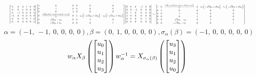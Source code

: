 \documentclass[11pt]{article}
\theoremstyle{definition}
\begin{document}
\[
\scaletoalign{\textwidth}{{\left[\begin{matrix}0 & 0 & 0 & 1 & 0 & 0\\0 & 0 & 1 & 0 & 0 & 0\\0 & -1 & 0 & 0 & 0 & 0\\-1 & 0 & 0 & 0 & 0 & 0\\0 & 0 & 0 & 0 & 1 & 0\\0 & 0 & 0 & 0 & 0 & 1\end{matrix}\right]} {\left[\begin{matrix}1 & 0 & 0 & 0 & 0 & 0\\0 & 1 & 0 & 0 & 0 & 0\\0 & 0 & 1 & 0 & 0 & 0\\0 & \frac{\sqrt{d} \left(c_{0} d u_{2}^{2} - c_{0} u_{0}^{2} + c_{1} d u_{3}^{2} - c_{1} u_{1}^{2}\right)}{2} & 0 & 1 & c_{0} \left(- \sqrt{d} u_{0} + d u_{2}\right) & c_{1} \left(- \sqrt{d} u_{1} + d u_{3}\right)\\0 & \sqrt{d} u_{2} + u_{0} & 0 & 0 & 1 & 0\\0 & \sqrt{d} u_{3} + u_{1} & 0 & 0 & 0 & 1\end{matrix}\right]} {\left[\begin{matrix}0 & 0 & 0 & -1 & 0 & 0\\0 & 0 & -1 & 0 & 0 & 0\\0 & 1 & 0 & 0 & 0 & 0\\1 & 0 & 0 & 0 & 0 & 0\\0 & 0 & 0 & 0 & 1 & 0\\0 & 0 & 0 & 0 & 0 & 1\end{matrix}\right]} = {\left[\begin{matrix}1 & 0 & \frac{\sqrt{d} \left(- c_{0} d u_{2}^{2} + c_{0} u_{0}^{2} - c_{1} d u_{3}^{2} + c_{1} u_{1}^{2}\right)}{2} & 0 & c_{0} \left(- \sqrt{d} u_{0} + d u_{2}\right) & c_{1} \left(- \sqrt{d} u_{1} + d u_{3}\right)\\0 & 1 & 0 & 0 & 0 & 0\\0 & 0 & 1 & 0 & 0 & 0\\0 & 0 & 0 & 1 & 0 & 0\\0 & 0 & - \sqrt{d} u_{2} - u_{0} & 0 & 1 & 0\\0 & 0 & - \sqrt{d} u_{3} - u_{1} & 0 & 0 & 1\end{matrix}\right]}}
\]
\[
\alpha = \left( -1, \  -1, \  0, \  0, \  0, \  0\right), \beta = \left( 0, \  1, \  0, \  0, \  0, \  0\right), \sigma_{\alpha}(\beta) = \left( -1, \  0, \  0, \  0, \  0, \  0\right)
\]
\[
\scaletoalign{\textwidth}{w_{\alpha} X_{\beta}\left(\left[\begin{matrix}u_{0}\\u_{1}\\u_{2}\\u_{3}\end{matrix}\right]\right) w_{\alpha}^{-1} = X_{\sigma_{\alpha}\left(\beta\right)}\left(\left[\begin{matrix}u_{3}\\u_{1}\\u_{2}\\u_{0}\end{matrix}\right]\right)}
\]
\end{document}
